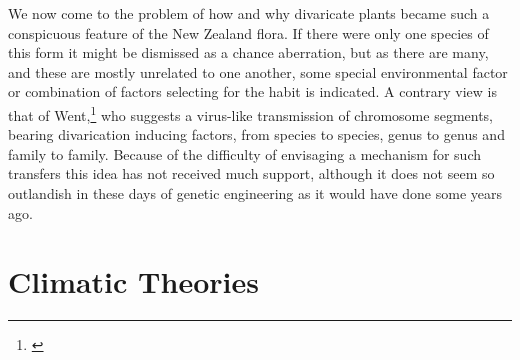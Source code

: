 We now come to the problem of how and why divaricate plants became such a conspicuous feature of the New Zealand flora.
If there were only one species of this form it might be dismissed as a chance aberration, but as there are many, and these are mostly unrelated to one another, some special environmental factor or combination of factors selecting for the habit is indicated.
A contrary view is that of Went,\footnote{\cite{went1971parallel}} who suggests a virus-like transmission of chromosome segments, bearing divarication inducing factors, from species to species, genus to genus and family to family.
Because of the difficulty of envisaging a mechanism for such transfers this idea has not received much support, although it does not seem so outlandish in these days of genetic engineering as it would have done some years ago.

\section{Climatic Theories}

